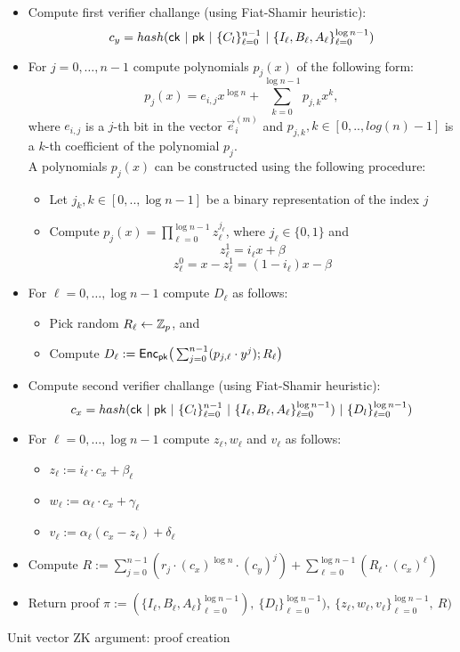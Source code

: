 {\begin{itemize}
\item Compute first verifier challange (using Fiat-Shamir heuristic):
\[c_y=hash(\ck\ |\ \pk\ |\ \{C_l\}_{\ell=0}^{n-1}\ |\ \{I_\ell,B_\ell,A_\ell\}_{\ell=0}^{\log n-1})\]

\item For $j = 0,\ldots, n-1$ compute polynomials $p_j(x)$ of the following form:
\[p_j(x) = e_{i,j} x^{\log n} + \sum_{k=0}^{\log n -1} p_{j,k} x^k,\]
where $e_{i,j}$ is a $j$-th bit in the vector $\vec{e}_i^{(m)}$ and $p_{j,k}, k \in [0,..,log(n)-1]$ is a $k$-th coefficient of the polynomial $p_{j}$.\\
A polynomials $p_j(x)$ can be constructed using the following procedure:
\begin{itemize}
    \item Let $j_k, k \in [0,..,\log n-1]$ be a binary representation of the index $j$
    \item Compute $p_j(x)=\prod_{\ell=0}^{\log n-1} z_{\ell}^{j_\ell}$, where $j_\ell \in \{0,1\}$ and
    \[z^1_{\ell}=i_{\ell} x + \beta\]
    \[z^0_{\ell}=x-z^1_{\ell}=(1-i_{\ell}) x - \beta\]
\end{itemize}

\item For $\ell = 0,\ldots, \log n-1$ compute $D_{\ell}$ as follows:
    \begin{itemize}
    \item Pick random $R_\ell\leftarrow \mathbb{Z}_p$, and 
    \item Compute $D_\ell:=\mathsf{Enc}_{\mathsf{pk}}\big(\sum_{j=0}^{n-1} (p_{j,\ell} \cdot y^j);R_\ell \big)$
    \end{itemize}

\item Compute second verifier challange (using Fiat-Shamir heuristic):
\[c_x=hash(\ck\ |\ \pk\ |\ \{C_l\}_{\ell=0}^{n-1}\ |\ \{I_\ell,B_\ell,A_\ell\}_{\ell=0}^{\log n-1})\ |\ \{D_l\}_{\ell=0}^{\log n-1})\]

\item For $\ell = 0,\ldots, \log n-1$ compute $z_{\ell}, w_{\ell}$ and $v_{\ell}$ as follows:
    \begin{itemize}
        \item $z_\ell:= i_\ell \cdot c_x + \beta_\ell$
        \item $w_\ell:= \alpha_\ell \cdot c_x + \gamma_\ell$
        \item $v_\ell:= \alpha_\ell (c_x-z_\ell) + \delta_\ell$
    \end{itemize}

\item Compute $R:= \sum_{j=0}^{n-1}( r_j \cdot (c_x)^{\log n} \cdot (c_y)^j)  + \sum_{\ell=0}^{\log n -1} (R_\ell \cdot (c_x)^\ell)$

\item Return proof $\pi:=(\{I_\ell,B_\ell,A_\ell\}_{\ell=0}^{\log n-1}),\ \{D_l\}_{\ell=0}^{\log n-1}),\ \{z_\ell,w_\ell,v_\ell\}_{\ell=0}^{\log n-1},\ R)$
\end{itemize}
}{Unit vector ZK argument: proof creation  \label{fig:unit_zk_prover}}

